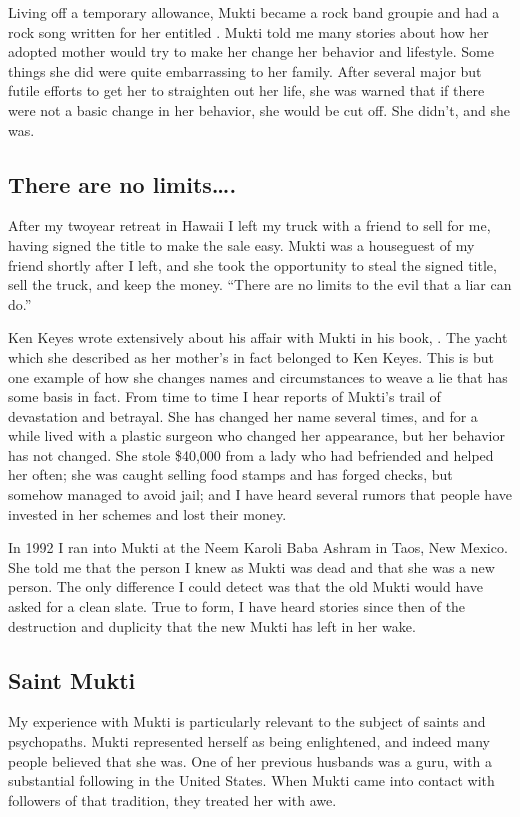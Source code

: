 \documentclass[a5paper,10pt,english]{book}
\begin{document}
\sphinxAtStartPar
Living off a temporary allowance, Mukti became a rock band groupie and
had a rock song written for her entitled . Mukti told me
many stories about how her adopted mother would try to make her change
her behavior and lifestyle. Some things she did were quite embarrassing
to her family. After several major but futile efforts to get her to
straighten out her life, she was warned that if there were not a basic
change in her behavior, she would be cut off. She didn’t, and she was.


\subsection{There are no limits….}
\label{\detokenize{psychopaths:there-are-no-limits}}
\sphinxAtStartPar
After my two\sphinxhyphen{}year retreat in Hawaii I left my truck with a friend to
sell for me, having signed the title to make the sale easy. Mukti was a
houseguest of my friend shortly after I left, and she took the
opportunity to steal the signed title, sell the truck, and keep the
money. “There are no limits to the evil that a liar can do.”

\sphinxAtStartPar
Ken Keyes wrote extensively about his affair with Mukti in his book,
. The yacht which she described
as her mother’s in fact belonged to Ken Keyes. This is but one example
of how she changes names and circumstances to weave a lie that has some
basis in fact. From time to time I hear reports of Mukti’s trail of
devastation and betrayal. She has changed her name several times, and
for a while lived with a plastic surgeon who changed her appearance, but
her behavior has not changed. She stole \$40,000 from a lady who had
befriended and helped her often; she was caught selling food stamps and
has forged checks, but somehow managed to avoid jail; and I have heard
several rumors that people have invested in her schemes and lost their
money.

\sphinxAtStartPar
In 1992 I ran into Mukti at the Neem Karoli Baba Ashram in Taos, New
Mexico. She told me that the person I knew as Mukti was dead and that
she was a new person. The only difference I could detect was that the
old Mukti would have asked for a clean slate. True to form, I have heard
stories since then of the destruction and duplicity that the new Mukti
has left in her wake.


\subsection{Saint Mukti}
\label{\detokenize{psychopaths:saint-mukti}}
\sphinxAtStartPar
My experience with Mukti is particularly relevant to the subject of
saints and psychopaths. Mukti represented herself as being enlightened,
and indeed many people believed that she was. One of her previous
husbands was a guru, with a substantial following in the United States.
When Mukti came into contact with followers of that tradition, they
treated her with awe.
\end{document}
